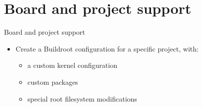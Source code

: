 \section{Board and project support}

\setuplabframe
{Board and project support}
{
  \begin{itemize}
  \item Create a Buildroot configuration for a
    specific project, with:
    \begin{itemize}
    \item a custom kernel configuration
    \item custom packages
    \item special root filesystem modifications
    \end{itemize}
  \end{itemize}
}
